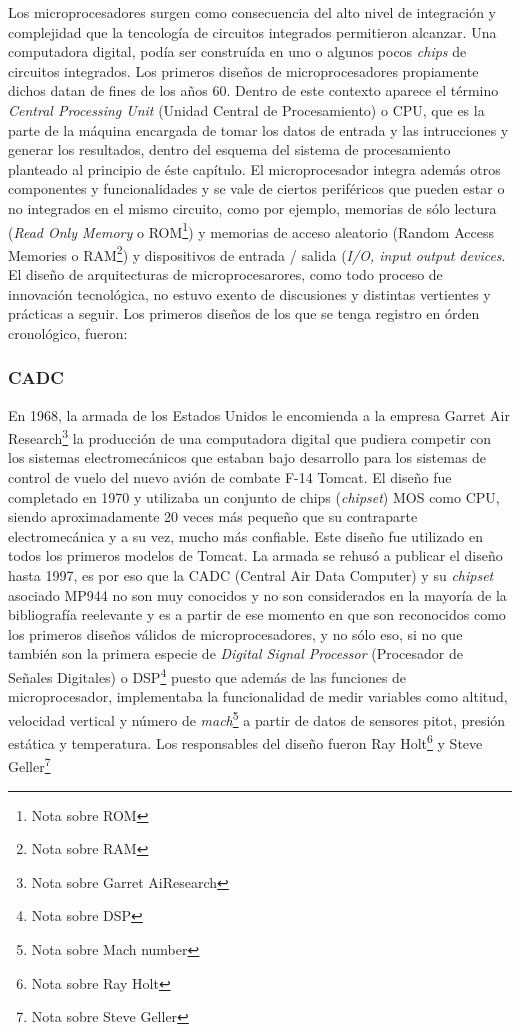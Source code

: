 Los microprocesadores surgen como consecuencia del alto nivel de integración y complejidad que la tencología de circuitos integrados permitieron alcanzar. Una computadora digital, podía ser construída en uno o algunos pocos \emph{chips} de circuitos integrados. Los primeros diseños de microprocesadores propiamente dichos datan de fines de los años 60. Dentro de este contexto aparece el término \emph{Central Processing Unit} (Unidad Central de Procesamiento) o CPU, que es la parte de la máquina encargada de tomar los datos de entrada y las intrucciones y generar los resultados, dentro del esquema del sistema de procesamiento planteado al principio de éste capítulo. El microprocesador integra además otros componentes y funcionalidades y se vale de ciertos periféricos que pueden estar o no integrados en el mismo circuito, como por ejemplo, memorias de sólo lectura (\emph{Read Only Memory} o ROM\footnote{Nota sobre ROM}) y memorias de acceso aleatorio (Random Access Memories o RAM\footnote{Nota sobre RAM}) y dispositivos de entrada / salida (\emph{I/O, input output devices}. El diseño de arquitecturas de microprocesarores, como todo proceso de innovación tecnológica, no estuvo exento de discusiones y distintas vertientes y prácticas a seguir. Los primeros diseños de los que se tenga registro en órden cronológico, fueron:

\subsubsection{CADC}

En 1968, la armada de los Estados Unidos le encomienda a la empresa Garret Air Research\footnote{Nota sobre Garret AiResearch} la producción de una computadora digital que pudiera competir con los sistemas electromecánicos que estaban bajo desarrollo para los sistemas de control de vuelo del nuevo avión de combate F-14 Tomcat. El diseño fue completado en 1970 y utilizaba un conjunto de chips (\emph{chipset}) MOS como CPU, siendo aproximadamente 20 veces más pequeño que su contraparte electromecánica y a su vez, mucho más confiable. Este diseño fue utilizado en todos los primeros modelos de Tomcat. La armada se rehusó a publicar el diseño hasta 1997, es por eso que la CADC (Central Air Data Computer) y su \emph{chipset} asociado MP944 no son muy conocidos y no son considerados en la mayoría de la bibliografía reelevante y es a partir de ese momento en que son reconocidos como los primeros diseños válidos de microprocesadores, y no sólo eso, si no que también son la primera especie de \emph{Digital Signal Processor} (Procesador de Señales Digitales) o DSP\footnote{Nota sobre DSP} puesto que además de las funciones de microprocesador, implementaba la funcionalidad de medir variables como altitud, velocidad vertical y número de \emph{mach}\footnote{Nota sobre Mach number} a partir de datos de sensores pitot, presión estática y temperatura. Los responsables del diseño fueron Ray Holt\footnote{Nota sobre Ray Holt} y Steve Geller\footnote{Nota sobre Steve Geller}

